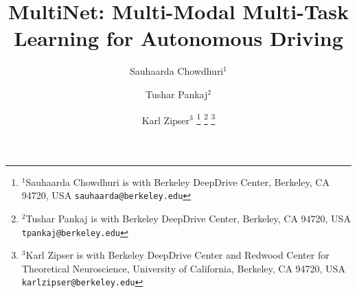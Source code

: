 \documentclass[letterpaper, 10 pt, conference]{ieeeconf}
\title{\LARGE \bf
MultiNet: Multi-Modal Multi-Task Learning for Autonomous Driving
}
\author{Sauhaarda Chowdhuri$^{1}$ \and Tushar Pankaj$^{2}$ \and Karl Zipser$^{3}$%
\thanks{$^{1}$Sauhaarda Chowdhuri is with Berkeley DeepDrive Center,
        Berkeley, CA 94720, USA
        {\tt\small sauhaarda@berkeley.edu}}%
\thanks{$^{2}$Tushar Pankaj is with Berkeley DeepDrive Center,
        Berkeley, CA 94720, USA
        {\tt\small tpankaj@berkeley.edu}}%
\thanks{$^{3}$Karl Zipser is with Berkeley DeepDrive Center and Redwood Center for Theoretical Neuroscience, University of California,
        Berkeley, CA 94720, USA
        {\tt\small karlzipser@berkeley.edu}}%
}
\begin{document}
\maketitle
\thispagestyle{empty}
\pagestyle{empty}

\begin{abstract}

\end{abstract}









\end{document}
